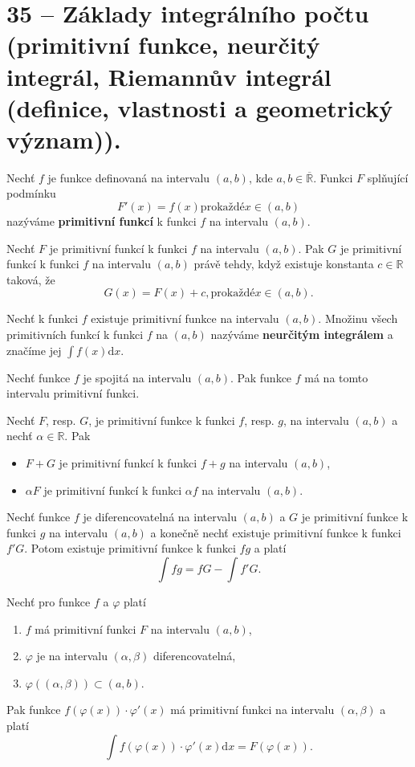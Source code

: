 \section{35 -- Základy integrálního počtu (primitivní funkce, neurčitý integrál, Riemannův integrál (definice, vlastnosti a geometrický význam)).}

 Nechť $f$ je funkce definovaná na intervalu $(a, b)$, kde $a,b\in\overline{\mathbb{R}}$. Funkci $F$ splňující podmínku
$$
	F' (x) = f (x) \mathrm{pro každé} x \in (a, b)
$$
nazýváme \textbf{primitivní funkcí} k funkci $f$ na intervalu $(a, b)$.

\theorem Nechť $F$ je primitivní funkcí k funkci $f$ na intervalu $(a, b)$. Pak $G$ je primitivní funkcí k funkci $f$ na intervalu $(a, b)$ právě tehdy, když existuje konstanta $c \in \mathbb{R}$ taková, že
$$
	G(x) = F (x) + c, \mathrm{pro každé} x \in (a, b).
$$

 Nechť k funkci $f$ existuje primitivní funkce na intervalu $(a, b)$. Množinu všech primitivních funkcí k funkci $f$ na $(a, b)$ nazýváme \textbf{neurčitým integrálem} a značíme jej $\int f (x) \mathrm{d}x$.

 Nechť funkce $f$ je spojitá na intervalu $(a, b)$. Pak funkce $f$ má na tomto intervalu primitivní funkci.

\theorem Nechť $F$, resp. $G$, je primitivní funkce k funkci $f$, resp. $g$, na intervalu $(a, b)$ a nechť $\alpha\in\mathbb{R}$. Pak
\vspace{-5pt}
\begin{itemize}
	\item $F + G$ je primitivní funkcí k funkci $f + g$ na intervalu $(a, b)$,
	\item $\alpha F$ je primitivní funkcí k funkci $\alpha f$ na intervalu $(a, b)$.
\end{itemize}
\vspace{-5pt}

 Nechť funkce $f$ je diferencovatelná na intervalu $(a, b)$ a $G$ je primitivní funkce k funkci $g$ na intervalu $(a, b)$ a konečně nechť existuje primitivní funkce k funkci $f' G$. Potom existuje primitivní funkce k funkci $fg$ a platí
$$
	\int fg = fG - \int f'G.
$$

\theorem [Substituce I] Nechť pro funkce $f$ a $\varphi$ platí
\vspace{-5pt}
\begin{enumerate}
	\item $f$ má primitivní funkci $F$ na intervalu $(a, b)$,
	\item $\varphi$ je na intervalu $(\alpha, \beta)$ diferencovatelná,
	\item $\varphi((\alpha, \beta)) \subset (a, b)$.
\end{enumerate}
\vspace{-5pt}
Pak funkce $f(\varphi(x)) \cdot \varphi'(x)$ má primitivní funkci na intervalu $(\alpha, \beta)$ a platí
$$
	\int f(\varphi(x))\cdot \varphi'(x)\mathrm{d}x = F(\varphi(x)).
$$

